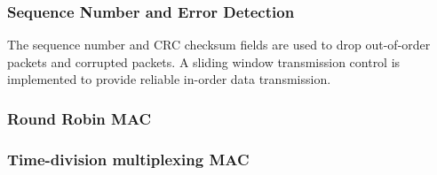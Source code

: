 \subsubsection{Sequence Number and Error Detection}
The sequence number and CRC checksum fields are used to drop out-of-order packets and corrupted packets.
A sliding window transmission control is implemented to provide reliable in-order data transmission.

\subsubsection{Round Robin MAC}

\subsubsection{Time-division multiplexing MAC}

